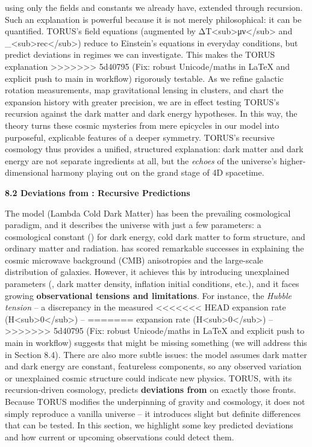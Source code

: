 \documentclass[]{article}
\begin{document}
using only the fields and constants we already have, extended through
recursion. Such an explanation is powerful because it is not merely
philosophical: it can be quantified. TORUS's field equations (augmented
by ΔT\textless{}sub\textgreater{}μν\textless{}/sub\textgreater{} and
\Lambda\_\textless{}sub\textgreater{}rec\textless{}/sub\textgreater{}) reduce
to Einstein's equations in everyday conditions, but predict deviations
in regimes we can investigate​. This makes the TORUS explanation
>>>>>>> 5d40795 (Fix: robust Unicode/maths in LaTeX and explicit push to main in workflow)
rigorously testable. As we refine galactic rotation measurements, map
gravitational lensing in clusters, and chart the expansion history with
greater precision, we are in effect testing TORUS's recursion against
the dark matter and dark energy hypotheses. In this way, the theory
turns these cosmic mysteries from mere epicycles in our model into
purposeful, explicable features of a deeper symmetry. TORUS's recursive
cosmology thus provides a unified, structured explanation: dark matter
and dark energy are not separate ingredients at all, but the
\emph{echoes} of the universe's higher-dimensional harmony playing out
on the grand stage of 4D spacetime.

\textbf{8.2 Deviations from \LambdaCDM: Recursive Predictions}

The \LambdaCDM model (Lambda Cold Dark Matter) has been the prevailing
cosmological paradigm, and it describes the universe with just a few
parameters: a cosmological constant (\Lambda) for dark energy, cold dark
matter to form structure, and ordinary matter and radiation. \LambdaCDM has
scored remarkable successes in explaining the cosmic microwave
background (CMB) anisotropies and the large-scale distribution of
galaxies. However, it achieves this by introducing unexplained
parameters (\Lambda, dark matter density, inflation initial conditions, etc.),
and it faces growing \textbf{observational tensions and limitations}.
For instance, the \emph{Hubble tension} -- a discrepancy in the measured
<<<<<<< HEAD
expansion rate (H\textless sub\textgreater0\textless/sub\textgreater) --
=======
expansion rate
(H\textless{}sub\textgreater{}0\textless{}/sub\textgreater{}) --
>>>>>>> 5d40795 (Fix: robust Unicode/maths in LaTeX and explicit push to main in workflow)
suggests that \LambdaCDM might be missing something (we will address this in
Section 8.4). There are also more subtle issues: the model assumes dark
matter and dark energy are constant, featureless components, so any
observed variation or unexplained cosmic structure could indicate new
physics. TORUS, with its recursion-driven cosmology, predicts
\textbf{deviations from \LambdaCDM} on exactly those fronts. Because TORUS
modifies the underpinning of gravity and cosmology, it does not simply
reproduce a vanilla \LambdaCDM universe -- it introduces slight but definite
differences that can be tested. In this section, we highlight some key
predicted deviations and how current or upcoming observations could
detect them.
\end{document}
